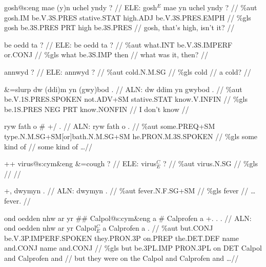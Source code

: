 \documentclass[a4paper,10pt]{article}
\begin{document}
\ex
\begingl[lingstyle=gergl]
\glchat gosh@s:eng mae (y)n uchel yndy ? //
\glsurface ELE:  gosh$^{E}$ mae yn uchel yndy ?  //
\glauto \%aut  gosh{\scriptsize .IM} be{\scriptsize .V.3S.PRES} stative{\scriptsize .STAT} high{\scriptsize .ADJ} be{\scriptsize .V.3S.PRES.EMPH}   //
\glmanual \%gls  gosh be{\scriptsize .3S.PRES} PRT high be{\scriptsize .3S.PRES}   //
\gleng gosh, that's high, isn't it? //
\endgl
\xe

\ex
\begingl[lingstyle=gergl]
\glchat be oedd ta ? //
\glsurface ELE:  be oedd ta ?  //
\glauto \%aut  what{\scriptsize .INT} be{\scriptsize .V.3S.IMPERF} or{\scriptsize .CONJ}   //
\glmanual \%gls  what be{\scriptsize .3S.IMP} then   //
\gleng what was it, then? //
\endgl
\xe

\ex
\begingl[lingstyle=gergl]
\glchat annwyd ? //
\glsurface ELE:  annwyd ?  //
\glauto \%aut  cold{\scriptsize .N.M.SG}   //
\glmanual \%gls  cold   //
\gleng a cold? //
\endgl
\xe

\ex
\begingl[lingstyle=gergl]
\glchat \&=slurp dw (ddi)m yn (gwy)bod . //
\glsurface ALN:  dw ddim yn gwybod .  //
\glauto \%aut  be{\scriptsize .V.1S.PRES.SPOKEN} not{\scriptsize .ADV+SM} stative{\scriptsize .STAT} know{\scriptsize .V.INFIN}   //
\glmanual \%gls  be{\scriptsize .1S.PRES} NEG PRT know{\scriptsize .NONFIN}   //
\gleng I don't know //
\endgl
\xe

\ex
\begingl[lingstyle=gergl]
\glchat ryw fath o \# +/ . //
\glsurface ALN:  ryw fath o .  //
\glauto \%aut  some{\scriptsize .PREQ+SM} type{\scriptsize .N.M.SG+SM[or]bath.N.M.SG+SM} he{\scriptsize .PRON.M.3S.SPOKEN}   //
\glmanual \%gls  some kind of   //
\gleng some kind of \dots  //
\endgl
\xe

\ex
\begingl[lingstyle=gergl]
\glchat ++ virus@s:cym\&eng \&=cough ? //
\glsurface ELE:  virus$^{C}_{E}$ ?  //
\glauto \%aut  virus{\scriptsize .N.SG}   //
\glmanual \%gls     //
\gleng  //
\endgl
\xe

\ex
\begingl[lingstyle=gergl]
\glchat +, dwymyn . //
\glsurface ALN:  dwymyn .  //
\glauto \%aut  fever{\scriptsize .N.F.SG+SM}   //
\glmanual \%gls  fever   //
\gleng  \dots fever. //
\endgl
\xe

\ex
\begingl[lingstyle=gergl]
\glchat ond oedden nhw ar yr \#\# Calpol@s:cym\&eng a \# Calprofen a +. . . //
\glsurface ALN:  ond oedden nhw ar yr Calpol$^{C}_{E}$ a Calprofen a .  //
\glauto \%aut  but{\scriptsize .CONJ} be{\scriptsize .V.3P.IMPERF.SPOKEN} they{\scriptsize .PRON.3P} on{\scriptsize .PREP} the{\scriptsize .DET.DEF} name and{\scriptsize .CONJ} name and{\scriptsize .CONJ}   //
\glmanual \%gls  but be{\scriptsize .3PL.IMP} PRON{\scriptsize .3PL} on DET Calpol and Calprofen and   //
\gleng but they were on the Calpol and Calprofen and \dots  //
\endgl
\xe
\end{document}
